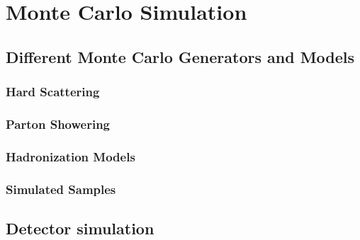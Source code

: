 \chapter{Monte Carlo Simulation}

\section{Different Monte Carlo Generators and Models}
\subsection{Hard Scattering}
\subsection{Parton Showering}
\subsection{Hadronization Models}
\subsection{Simulated Samples}

\section{Detector simulation}